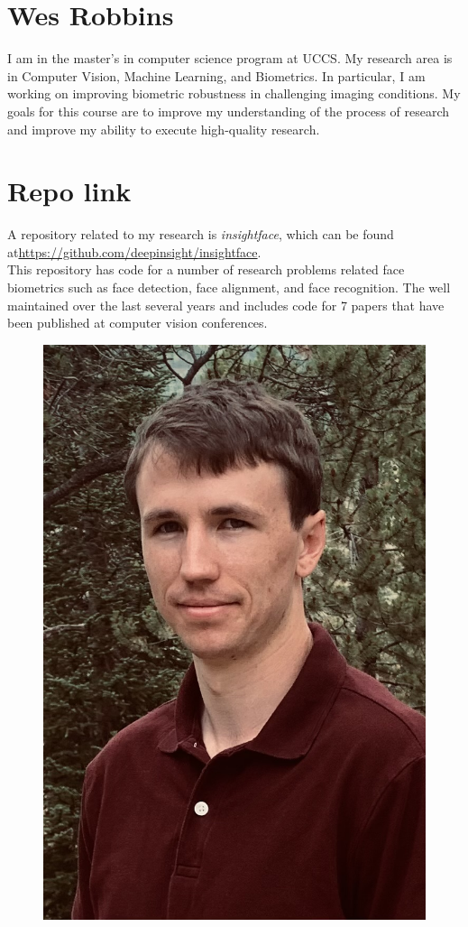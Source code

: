 \section{Wes Robbins}
I am in the master's in computer science program at UCCS. My research area is in Computer Vision, Machine Learning, and Biometrics. In particular, I am working on improving biometric robustness in challenging imaging conditions. My goals for this course are to improve my understanding of the process of research and improve my ability to execute high-quality research. 

\section{Repo link}
A repository related to my research is \textit{insightface},
which can be found at\newline \url{https://github.com/deepinsight/insightface}. \\
This repository has code for a number of research problems related face biometrics such as face detection, face alignment, and face recognition. The well maintained over the last several years and includes code for 7 papers that have been published at computer vision conferences.


\begin{figure}[h]
    \centering
    \includegraphics[width=.25\textwidth]{robbins.jpg}
\end{figure}
